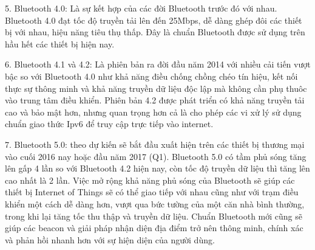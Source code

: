 5.    Bluetooth 4.0: Là sự kết hợp của các đời Bluetooth trước đó với nhau. Bluetooth 4.0 đạt tốc độ truyền tải lên đến 25Mbps, dễ dàng ghép đôi các thiết bị với nhau, hiệu năng tiêu thụ thấp. Đây là chuẩn Bluetooth được sử dụng trên hầu hết các thiết bị hiện nay.

6.    Bluetooth 4.1 và 4.2: Là phiên bản ra đời đầu năm 2014 với nhiều cải tiến vượt bậc so với Bluetooth 4.0 như khả năng điều chống chồng chéo tín hiệu, kết nối thực sự thông minh và khả năng truyền dữ liệu độc lập mà không cần phụ thuôc vào trung tâm điều khiển. Phiên bản 4.2 được phát triển có khả năng truyền tải cao và bảo mật hơn, nhưng quan trọng hơn cả là cho phép các vi xử lý sử dụng chuẩn giao thức Ipv6 để truy cập trực tiếp vào internet.

7.	Bluetooth 5.0: theo dự kiến sẽ bắt đầu xuất hiện trên các thiết bị thương mại vào cuối 2016 nay hoặc đầu năm 2017 (Q1). Bluetooth 5.0 có tầm phủ sóng tăng lên gấp 4 lần so với Bluetooth 4.2 hiện nay, còn tốc độ truyền dữ liệu thì tăng lên cao nhất là 2 lần. Việc mở rộng khả năng phủ sóng của Bluetooth sẽ giúp các thiết bị Internet of Things sẽ có thể giao tiếp với nhau cũng như với trạm điều khiển một cách dễ dàng hơn, vượt qua bức tường của một căn nhà bình thường, trong khi lại tăng tốc thu thập và truyền dữ liệu. Chuẩn Bluetooth mới cũng sẽ giúp các beacon và giải pháp nhận diện địa điểm trở nên thông minh, chính xác và phản hồi nhanh hơn với sự hiện diện của người dùng.

